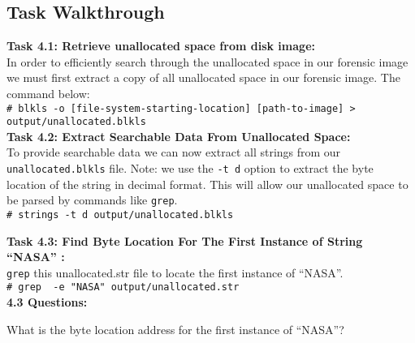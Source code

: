 \documentclass[a4paper,11pt]{article}
\begin{document}
\subsection*{Task Walkthrough}
{\noindent
\textbf{Task 4.1: Retrieve unallocated space from disk image:}\\
In order to efficiently search through the unallocated space in our forensic image we must first extract a copy of all unallocated space in our forensic image. The command below:\\ \noindent
\texttt{{\#} blkls -o [file-system-starting-location] [path-to-image] > \\output/unallocated.blkls}\\

}
{\noindent
\textbf{Task 4.2: Extract Searchable Data From Unallocated Space:}\\
To provide searchable data we can now extract all strings from our \texttt{unallocated.blkls} file. Note: we use the \texttt{-t d} option to extract the byte location of the string in decimal format. This will allow our unallocated space to be parsed by commands like \texttt{grep}.\\
\verb|# strings -t d output/unallocated.blkls |\\

}
{\noindent
\textbf{Task 4.3: Find Byte Location For The First Instance of String ``NASA'' :}\\
\texttt{grep} this unallocated.str file to locate the first instance of ``NASA''.\\
\verb|# grep  -e "NASA" output/unallocated.str|\\

\noindent
\textbf{4.3 Questions:}
\begin{enumerate*}
	\item What is the byte location address for the first instance of ``NASA''?\\
\end{enumerate*}
}
\end{document}
